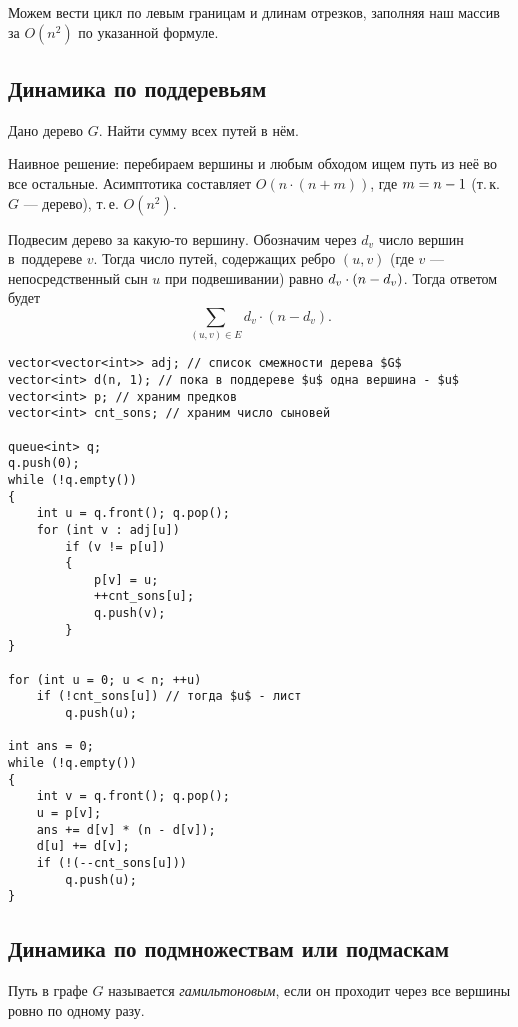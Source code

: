 Можем вести цикл по левым границам и длинам отрезков, заполняя наш массив за $O(n^2)$ по указанной формуле.

\subsection{Динамика по поддеревьям}

\begin{problem}
    Дано дерево $G$. Найти сумму всех путей в нём.
\end{problem}
%
Наивное решение: перебираем вершины и любым обходом ищем путь из неё во все остальные. Асимптотика составляет $O(n \cdot (n + m))$, где $m \hm = n - 1$ (т.\,к. $G$ --- дерево), т.\,е. $O(n^2)$.

Подвесим дерево за какую-то вершину. Обозначим через $d_v$ число вершин в~поддереве $v$. Тогда число путей, содержащих ребро $(u, v)$ (где $v$ --- непосредственный сын $u$ при подвешивании) равно $d_v \cdot (n \hm - d_v)$. Тогда ответом будет
\[
    \sum\limits_{(u, v) \in E}d_v \cdot (n - d_v).
\]

\begin{verbatim}
vector<vector<int>> adj; // список смежности дерева $G$
vector<int> d(n, 1); // пока в поддереве $u$ одна вершина - $u$
vector<int> p; // храним предков
vector<int> cnt_sons; // храним число сыновей

queue<int> q;
q.push(0);
while (!q.empty())
{
    int u = q.front(); q.pop();
    for (int v : adj[u])
        if (v != p[u])
        {
            p[v] = u;
            ++cnt_sons[u];
            q.push(v);
        }
}

for (int u = 0; u < n; ++u)
    if (!cnt_sons[u]) // тогда $u$ - лист
        q.push(u);

int ans = 0;
while (!q.empty())
{
    int v = q.front(); q.pop();
    u = p[v];
    ans += d[v] * (n - d[v]);
    d[u] += d[v];
    if (!(--cnt_sons[u]))
        q.push(u);
}
\end{verbatim}

\subsection{Динамика по подмножествам или подмаскам}

\begin{definition}
    Путь в графе $G$ называется \textit{гамильтоновым}, если он проходит через все вершины ровно по одному разу.
\end{definition}

